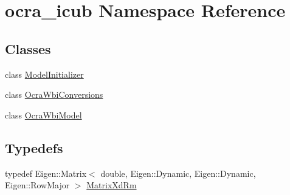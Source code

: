 \hypertarget{namespaceocra__icub}{\section{ocra\-\_\-icub \-Namespace \-Reference}
\label{namespaceocra__icub}
}
\subsection*{\-Classes}
\begin{DoxyCompactItemize}
\item 
class \hyperlink{classocra__icub_1_1ModelInitializer}{\-Model\-Initializer}
\item 
class \hyperlink{classocra__icub_1_1OcraWbiConversions}{\-Ocra\-Wbi\-Conversions}
\item 
class \hyperlink{classocra__icub_1_1OcraWbiModel}{\-Ocra\-Wbi\-Model}
\end{DoxyCompactItemize}
\subsection*{\-Typedefs}
\begin{DoxyCompactItemize}
\item 
typedef \-Eigen\-::\-Matrix$<$ double, \*
\-Eigen\-::\-Dynamic, \-Eigen\-::\-Dynamic, \*
\-Eigen\-::\-Row\-Major $>$ \hyperlink{namespaceocra__icub_aa5e36a19ed031c28ca83c207bd7dd83f}{\-Matrix\-Xd\-Rm}
\end{DoxyCompactItemize}

